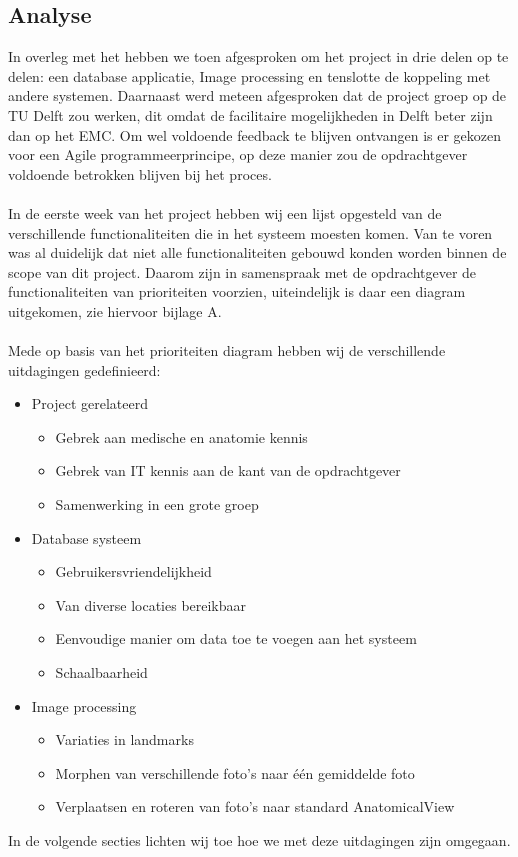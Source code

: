 \subsection{Analyse}
In overleg met het \casamproject hebben we toen afgesproken om het project in drie delen op te delen: een database applicatie, Image processing en tenslotte de koppeling met andere systemen. 
Daarnaast werd meteen afgesproken dat de project groep op de TU Delft zou werken, dit omdat de facilitaire mogelijkheden in Delft beter zijn dan op het EMC. 
Om wel voldoende feedback te blijven ontvangen is er gekozen voor een Agile programmeerprincipe, op deze manier zou de opdrachtgever voldoende betrokken blijven bij het proces.
\\
\\
In de eerste week van het project hebben wij een lijst opgesteld van de verschillende functionaliteiten die in het systeem moesten komen. 
Van te voren was al duidelijk dat niet alle functionaliteiten gebouwd konden worden binnen de scope van dit project. 
Daarom zijn in samenspraak met de opdrachtgever de functionaliteiten van prioriteiten voorzien, uiteindelijk is daar een diagram uitgekomen, zie hiervoor bijlage A.
\\
\\
Mede op basis van het prioriteiten diagram hebben wij de verschillende uitdagingen gedefinieerd:
\begin{itemize}
  \item Project gerelateerd
  \begin{itemize}
    \item Gebrek aan medische en anatomie kennis
    \item Gebrek van IT kennis aan de kant van de opdrachtgever
    \item Samenwerking in een grote groep
  \end{itemize}
  \item Database systeem
  \begin{itemize}
    \item Gebruikersvriendelijkheid
    \item Van diverse locaties bereikbaar
    \item Eenvoudige manier om data toe te voegen aan het systeem
    \item Schaalbaarheid
  \end{itemize}
  \item Image processing
  \begin{itemize}
    \item Variaties in landmarks
    \item Morphen van verschillende foto's naar \'{e}\'{e}n gemiddelde foto
    \item Verplaatsen en roteren van foto's naar standard AnatomicalView
  \end{itemize}
\end{itemize}
In de volgende secties lichten wij toe hoe we met deze uitdagingen zijn omgegaan.
